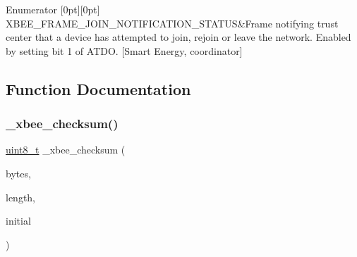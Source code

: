 \begin{DoxyEnumFields}{Enumerator}
[0pt][0pt]{}\mbox{\label{group__xbee__device_gga7753bbebaf00d6d64942f64b6ae9b7b9a7c62b1f46ca384f2e605632ab0f73214}} 
X\+B\+E\+E\+\_\+\+F\+R\+A\+M\+E\+\_\+\+J\+O\+I\+N\+\_\+\+N\+O\+T\+I\+F\+I\+C\+A\+T\+I\+O\+N\+\_\+\+S\+T\+A\+T\+US&Frame notifying trust center that a device has attempted to join, rejoin or leave the network. Enabled by setting bit 1 of A\+T\+DO. \mbox{[}Smart Energy, coordinator\mbox{]} \\
\hline

\end{DoxyEnumFields}


\subsection{Function Documentation}
\mbox{\label{group__xbee__device_gae8a32665036083d3a236fcde4359cc79}} 
\subsubsection{\texorpdfstring{\+\_\+xbee\+\_\+checksum()}{\_xbee\_checksum()}}
{\footnotesize\ttfamily \hyperlink{group__hal__dos_gae1affc9ca37cfb624959c866a73f83c2}{uint8\+\_\+t} \+\_\+xbee\+\_\+checksum (\begin{DoxyParamCaption}\item[{const void \hyperlink{group__hal_gaef060b3456fdcc093a7210a762d5f2ed}{F\+AR} $\ast$}]{bytes,  }\item[{\hyperlink{group__hal__dos_ga5a8b2dc9e45a9ee81a94ef304fb62505}{uint16\+\_\+t}}]{length,  }\item[{uint\+\_\+fast8\+\_\+t}]{initial }\end{DoxyParamCaption})}



